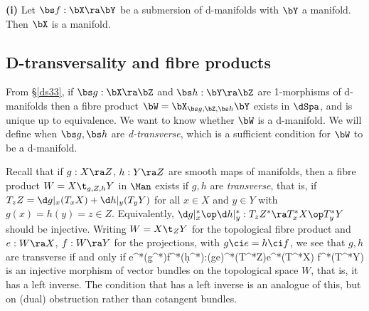 \documentclass{article}
\begin{document}
\begin{thm}{\bf(i)}
 Let\/ $\bs f:\bX\ra\bY$ be a submersion of
d-manifolds with\/ $\bY$ a manifold. Then\/ $\bX$ is a
manifold.
\label{ds4thm6}
\end{thm}

\subsection{D-transversality and fibre products}
\label{ds46}
 

From \S\ref{ds33}, if $\bs g:\bX\ra\bZ$ and $\bs h:\bY\ra\bZ$ are
1-morphisms of d-manifolds then a fibre product $\bW=\bX_{\bs
g,\bZ,\bs h}\bY$ exists in $\dSpa$, and is unique up to equivalence.
We want to know whether $\bW$ is a d-manifold. We will define when
$\bs g,\bs h$ are {\it d-transverse}, which is a sufficient
condition for $\bW$ to be a d-manifold.

Recall that if $g:X\ra Z$, $h:Y\ra Z$ are smooth maps of manifolds,
then a fibre product $W=X\t_{g,Z,h}Y$ in $\Man$ exists if $g,h$ are
{\it transverse}, that is, if
$T_zZ=\d g\vert_x(T_xX)+\d h\vert_y(T_yY)$ for all $x\in X$ and
$y\in Y$ with $g(x)=h(y)=z\in Z$. Equivalently, $\d g\vert_x^*\op\d
h\vert_y^*:T_zZ^*\ra T_x^*X\op T_y^*Y$ should be injective. Writing
$W=X\t_ZY$ for the topological fibre product and $e:W\ra X$, $f:W\ra
Y$ for the projections, with $g\ci e=h\ci f$, we see that $g,h$ are
transverse if and only if
\e
e^*(\d g^*)\op f^*(\d h^*):(g\ci e)^*(T^*Z)\ra e^*(T^*X)\op
f^*(T^*Y)
\label{ds4eq7}
\e
is an injective morphism of vector bundles on the topological space
$W$, that is, it has a left inverse. The condition that 
has a left inverse is an analogue of this, but on (dual) obstruction
rather than cotangent bundles.
\end{document}
